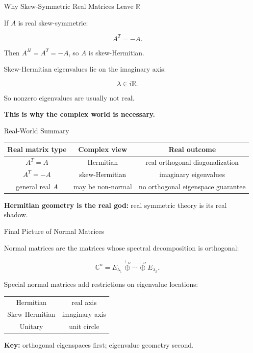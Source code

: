 \documentclass[10pt]{beamer}
\theoremstyle{definition}
\newcommand{\x}[1]{\alert{\textbf{#1}}}
\newcommand{\orthoplus}{\mathbin{\overset{\perp_H}{\oplus}}}
\begin{document}
\begin{frame}{Why Skew-Symmetric Real Matrices Leave $\mathbb{R}$}

If $A$ is real skew-symmetric:

$$
A^T=-A.
$$

\vfill\pause

Then $A^H=A^T=-A$, so $A$ is skew-Hermitian.

\vfill

Skew-Hermitian eigenvalues lie on the imaginary axis:

$$
\lambda\in i\mathbb{R}.
$$

\vfill\pause

So nonzero eigenvalues are usually not real.

\vfill

\x{This is why the complex world is necessary.}

\end{frame}


\begin{frame}{Real-World Summary}

\begin{center}
\renewcommand{\arraystretch}{1.5}
\scriptsize
\begin{tabular}{c|c|c}
\textbf{Real matrix type} & \textbf{Complex view} & \textbf{Real outcome}\\
\hline
$A^T=A$ & Hermitian & real orthogonal diagonalization\\
$A^T=-A$ & skew-Hermitian & imaginary eigenvalues\\
general real $A$ & may be non-normal & no orthogonal eigenspace guarantee
\end{tabular}
\end{center}

\vfill\pause

\x{Hermitian geometry is the real god:} real symmetric theory is its real shadow.

\end{frame}


\begin{frame}{Final Picture of Normal Matrices}

Normal matrices are the matrices whose spectral decomposition is orthogonal:

$$
\mathbb{C}^n
=E_{\lambda_1}\orthoplus\cdots\orthoplus E_{\lambda_k}.
$$

\vfill\pause

Special normal matrices add restrictions on eigenvalue locations:

\vfill

\begin{center}
\renewcommand{\arraystretch}{1.5}
\begin{tabular}{c|c}
Hermitian & real axis \\
Skew-Hermitian & imaginary axis \\
Unitary & unit circle
\end{tabular}
\end{center}

\vfill

\x{Key:} orthogonal eigenspaces first; eigenvalue geometry second.

\end{frame}
\end{document}
